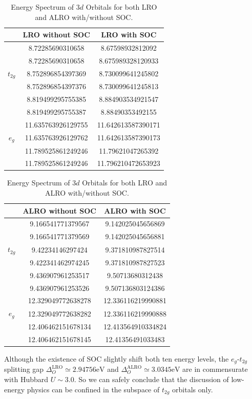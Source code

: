 \documentclass[10pt,nofootinbib,letterpaper]{revtex4}
\begin{document}
		\begin{table}[!htp]
			\begin{tabular}{|c|c|c|}
				 & LRO without SOC & LRO with SOC\\
				\hline
						&8.72285690310658	& 8.67598932812092\\
	  					&8.72285690310658	& 8.675989328120933\\
				$t_{2g}$&8.752896854397369	& 8.730099641245802\\
						&8.752896854397376	& 8.730099641245813\\
						&8.819499295755385	& 8.884903534921547\\
						&8.819499295755387	& 8.88490353492155\\
						\hline
						&11.635763926129755	& 11.642613587390171\\
				$e_g$	&11.635763926129762	& 11.642613587390173\\
						&11.789525861249246	& 11.79621047265392\\
						&11.789525861249246	& 11.796210472653923
			\end{tabular}
			\hspace{2em}
			\begin{tabular}{|c|c|c|}
				 & ALRO without SOC & ALRO with SOC\\
				\hline
						&9.166541771379567	&9.142025045656869\\
	  					&9.166541771379569	&9.142025045656881\\
				$t_{2g}$&9.42234146297424	&9.371810987827514\\
						&9.422341462974245	&9.371810987827523\\
						&9.436907961253517	&9.50713680312438\\
						&9.436907961253526	&9.507136803124386\\
						\hline
						&12.329049772638278	&12.336116219990881\\
				$e_g$	&12.329049772638282	&12.336116219990888\\
						&12.406462151678134	&12.413564910334824\\
						&12.406462151678145	&12.41356491033483
			\end{tabular}
			\caption{Energy Spectrum of $3d$ Orbitals for both LRO and ALRO with/without SOC.}
			\label{tab:LRO}
		\end{table}
		Although the existence of SOC slightly shift both ten energy levels, the $e_g$-$t_{2g}$ splitting gap $\Delta_O^{\text{LRO}}\simeq2.94756\mathrm{eV}$ and $\Delta_O^{\text{ALRO}}\simeq3.0345\mathrm{eV}$ are in commensurate with Hubbard $U\sim 3.0$. So we can safely conclude that the discussion of low-energy physics can be confined in the subspace of $t_{2g}$ orbitals only.\par
\end{document}
